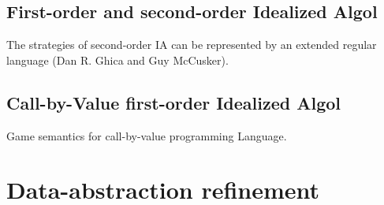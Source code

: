 \subsection{First-order and second-order Idealized Algol}

The strategies of second-order IA can be represented by an extended regular language
(Dan R. Ghica and Guy McCusker).

\subsection{Call-by-Value first-order Idealized Algol}

Game semantics for call-by-value programming Language.

\section{Data-abstraction refinement}


